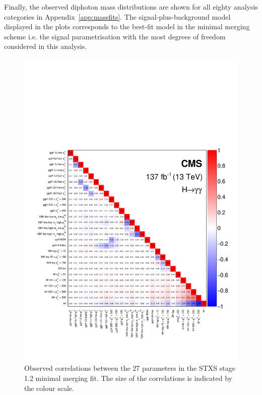 Finally, the observed diphoton mass distributions are shown for all eighty analysis categories in Appendix~\ref{app:massfits}. The signal-plus-background model displayed in the plots corresponds to the best-fit model in the minimal merging scheme i.e. the signal parametrisation with the most degrees of freedom considered in this analysis.

\begin{figure}[htbp]
  \centering
  \includegraphics[width=.97\textwidth]{Figures/hgg_results/stage1p2_minimal_correlations.pdf}
  \caption[Correlations in the STXS stage 1.2 minimal merging parameters]
  {
    Observed correlations between the 27 parameters in the STXS stage 1.2 minimal merging fit. The size of the correlations is indicated by the colour scale.
  }
  \label{fig:stage1p2_minimal_correlations}
\end{figure}



